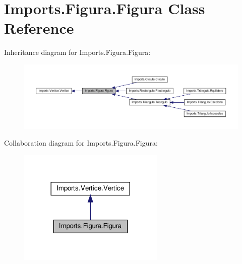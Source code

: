 \hypertarget{class_imports_1_1_figura_1_1_figura}{}\section{Imports.\+Figura.\+Figura Class Reference}
\label{class_imports_1_1_figura_1_1_figura}


Inheritance diagram for Imports.\+Figura.\+Figura\+:
\nopagebreak
\begin{figure}[H]
\begin{center}
\leavevmode
\includegraphics[width=350pt]{class_imports_1_1_figura_1_1_figura__inherit__graph}
\end{center}
\end{figure}


Collaboration diagram for Imports.\+Figura.\+Figura\+:
\nopagebreak
\begin{figure}[H]
\begin{center}
\leavevmode
\includegraphics[width=197pt]{class_imports_1_1_figura_1_1_figura__coll__graph}
\end{center}
\end{figure}
